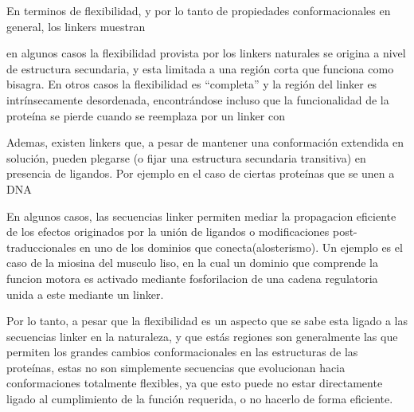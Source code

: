 En terminos de flexibilidad, y por lo tanto de propiedades conformacionales en general, los linkers muestran 

en algunos casos la flexibilidad provista por los linkers naturales se origina a nivel de estructura secundaria, y esta limitada a una región corta que funciona como bisagra.
En otros casos la flexibilidad es ``completa'' y la región del linker es intrínsecamente desordenada\cite{luo2010flexibility}, 
encontrándose incluso que la funcionalidad de la proteína se pierde cuando se reemplaza por un linker con \cite{hrycyna1998structural}

Ademas, existen linkers que, a pesar de mantener una conformación extendida en solución, pueden plegarse (o fijar una estructura secundaria transitiva) en presencia de ligandos.
Por ejemplo en el caso de ciertas proteínas que se unen a DNA\cite{laity2000dna}


En algunos casos, las secuencias linker permiten mediar la propagacion eficiente de los efectos originados por la unión de ligandos o modificaciones post-traduccionales en uno de los dominios que conecta(alosterismo).
Un ejemplo es el caso de la miosina del musculo liso, en la cual un dominio que comprende la funcion motora es activado mediante fosforilacion  de una cadena regulatoria unida a este mediante un linker\cite{ikebe1998hinge}.






Por lo tanto, a pesar que la flexibilidad es un aspecto que se sabe esta ligado a las secuencias linker en la naturaleza\cite{wriggers2005control}, 
y que estás regiones son generalmente las que permiten los grandes cambios conformacionales en las estructuras de las proteínas, 
estas no son simplemente secuencias que evolucionan hacia conformaciones totalmente flexibles, ya que esto puede no estar directamente ligado al cumplimiento de la función requerida, o no hacerlo de forma eficiente.

